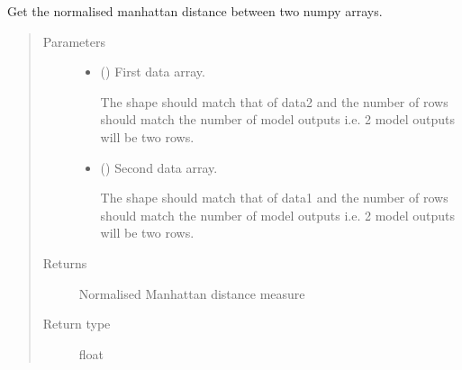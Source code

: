 \documentclass[letterpaper,10pt,english]{sphinxmanual}
\begin{document}

\begin{fulllineitems}
\label{\detokenize{abc:bayescmd.abc.distances.mean_absolute_error_dist}}
Get the normalised manhattan distance between two numpy arrays.
\begin{quote}\begin{description}
\item[{Parameters}] \leavevmode\begin{itemize}
\item {} 
 () \textendash{} 
First data array.

The shape should match that of data2 and the number of rows should
match the number of model outputs i.e. 2 model outputs will be two
rows.


\item {} 
 () \textendash{} 
Second data array.

The shape should match that of data1 and the number of rows should
match the number of model outputs i.e. 2 model outputs will be two
rows.


\end{itemize}

\item[{Returns}] \leavevmode
{} \textendash{} Normalised Manhattan distance measure

\item[{Return type}] \leavevmode
float

\end{description}\end{quote}

\end{fulllineitems}

\end{document}
